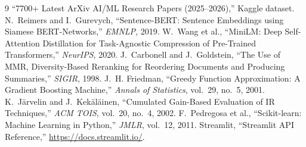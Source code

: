 \documentclass[12pt,a4paper]{article}
\begin{document}
\begin{thebibliography}{9}
 ``7700+ Latest ArXiv AI/ML Research Papers (2025--2026),''
Kaggle dataset.
 N.~Reimers and I.~Gurevych, ``Sentence-BERT: Sentence
Embeddings using Siamese BERT-Networks,'' \emph{EMNLP}, 2019.
 W.~Wang et al., ``MiniLM: Deep Self-Attention Distillation for
Task-Agnostic Compression of Pre-Trained Transformers,'' \emph{NeurIPS}, 2020.
 J.~Carbonell and J.~Goldstein, ``The Use of MMR, Diversity-Based
Reranking for Reordering Documents and Producing Summaries,'' \emph{SIGIR},
1998.
 J.~H. Friedman, ``Greedy Function Approximation: A Gradient
Boosting Machine,'' \emph{Annals of Statistics}, vol.~29, no.~5, 2001.
 K.~J\"arvelin and J.~Kek\"al\"ainen, ``Cumulated Gain-Based
Evaluation of IR Techniques,'' \emph{ACM TOIS}, vol.~20, no.~4, 2002.
 F.~Pedregosa et al., ``Scikit-learn: Machine Learning in
Python,'' \emph{JMLR}, vol.~12, 2011.
 Streamlit, ``Streamlit API Reference,''
\url{https://docs.streamlit.io/}.
\end{thebibliography}
\end{document}
